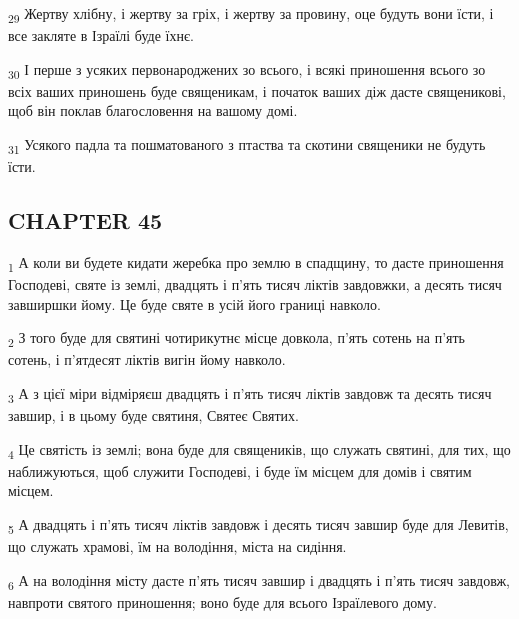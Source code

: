 \begin{tcolorbox}
\textsubscript{29} Жертву хлібну, і жертву за гріх, і жертву за провину, оце будуть вони їсти, і все закляте в Ізраїлі буде їхнє.
\end{tcolorbox}
\begin{tcolorbox}
\textsubscript{30} І перше з усяких первонароджених зо всього, і всякі приношення всього зо всіх ваших приношень буде священикам, і початок ваших діж дасте священикові, щоб він поклав благословення на вашому домі.
\end{tcolorbox}
\begin{tcolorbox}
\textsubscript{31} Усякого падла та пошматованого з птаства та скотини священики не будуть їсти.
\end{tcolorbox}
\subsection{CHAPTER 45}
\begin{tcolorbox}
\textsubscript{1} А коли ви будете кидати жеребка про землю в спадщину, то дасте приношення Господеві, святе із землі, двадцять і п'ять тисяч ліктів завдовжки, а десять тисяч завширшки йому. Це буде святе в усій його границі навколо.
\end{tcolorbox}
\begin{tcolorbox}
\textsubscript{2} З того буде для святині чотирикутнє місце довкола, п'ять сотень на п'ять сотень, і п'ятдесят ліктів вигін йому навколо.
\end{tcolorbox}
\begin{tcolorbox}
\textsubscript{3} А з цієї міри відміряєш двадцять і п'ять тисяч ліктів завдовж та десять тисяч завшир, і в цьому буде святиня, Святеє Святих.
\end{tcolorbox}
\begin{tcolorbox}
\textsubscript{4} Це святість із землі; вона буде для священиків, що служать святині, для тих, що наближуються, щоб служити Господеві, і буде їм місцем для домів і святим місцем.
\end{tcolorbox}
\begin{tcolorbox}
\textsubscript{5} А двадцять і п'ять тисяч ліктів завдовж і десять тисяч завшир буде для Левитів, що служать храмові, їм на володіння, міста на сидіння.
\end{tcolorbox}
\begin{tcolorbox}
\textsubscript{6} А на володіння місту дасте п'ять тисяч завшир і двадцять і п'ять тисяч завдовж, навпроти святого приношення; воно буде для всього Ізраїлевого дому.
\end{tcolorbox}
